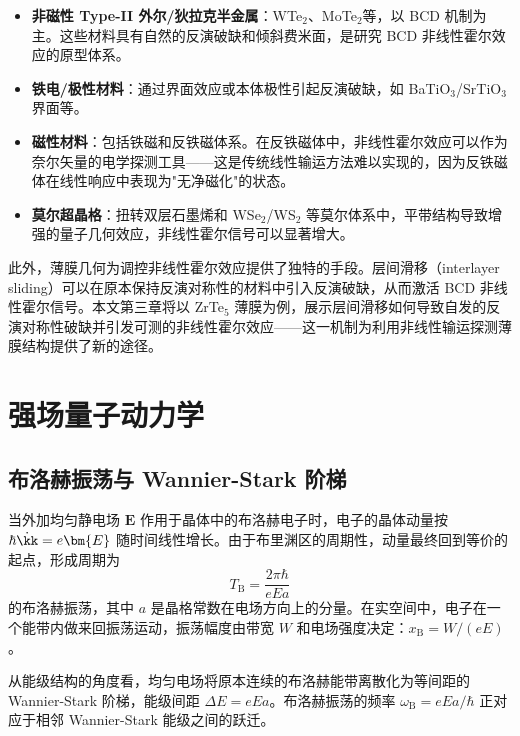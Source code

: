 \begin{itemize}
  \item \textbf{非磁性 Type-II 外尔/狄拉克半金属}：WTe$_2$\cite{ma2019observation,kang2019nonlinear}、MoTe$_2$\cite{shvetsov2019nonlinear}等，以 BCD 机制为主。这些材料具有自然的反演破缺和倾斜费米面，是研究 BCD 非线性霍尔效应的原型体系。
  \item \textbf{铁电/极性材料}：通过界面效应或本体极性引起反演破缺，如 BaTiO$_3$/SrTiO$_3$ 界面等。
  \item \textbf{磁性材料}：包括铁磁和反铁磁体系。在反铁磁体中，非线性霍尔效应可以作为奈尔矢量的电学探测工具——这是传统线性输运方法难以实现的，因为反铁磁体在线性响应中表现为"无净磁化"的状态。
  \item \textbf{莫尔超晶格}：扭转双层石墨烯\cite{He2022_grapheneMoire}和 WSe$_2$/WS$_2$ 等莫尔体系中，平带结构导致增强的量子几何效应，非线性霍尔信号可以显著增大。
\end{itemize}

此外，薄膜几何为调控非线性霍尔效应提供了独特的手段。层间滑移（interlayer sliding）可以在原本保持反演对称性的材料中引入反演破缺，从而激活 BCD 非线性霍尔信号。本文第三章将以 ZrTe$_5$ 薄膜为例，展示层间滑移如何导致自发的反演对称性破缺并引发可测的非线性霍尔效应——这一机制为利用非线性输运探测薄膜结构提供了新的途径。


\section{强场量子动力学}
\label{sec:strong-field}

\subsection{布洛赫振荡与 Wannier-Stark 阶梯}

当外加均匀静电场 $\bm{E}$ 作用于晶体中的布洛赫电子时，电子的晶体动量按 $\hbar\dot{\kk} = e\bm{E}$ 随时间线性增长。由于布里渊区的周期性，动量最终回到等价的起点，形成周期为
\begin{equation}
  T_\mathrm{B} = \frac{2\pi\hbar}{eEa}
\end{equation}
的布洛赫振荡，其中 $a$ 是晶格常数在电场方向上的分量。在实空间中，电子在一个能带内做来回振荡运动，振荡幅度由带宽 $W$ 和电场强度决定：$x_\mathrm{B} = W/(eE)$。

从能级结构的角度看，均匀电场将原本连续的布洛赫能带离散化为等间距的 Wannier-Stark 阶梯，能级间距 $\Delta E = eEa$。布洛赫振荡的频率 $\omega_\mathrm{B} = eEa/\hbar$ 正对应于相邻 Wannier-Stark 能级之间的跃迁。

